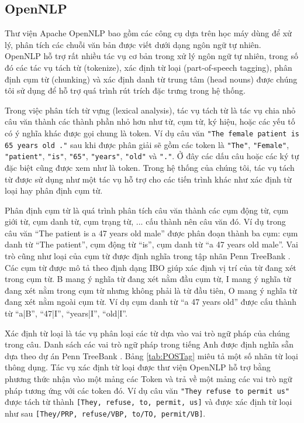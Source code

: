 \subsection*{OpenNLP}
Thư viện Apache OpenNLP bao gồm các công cụ dựa trên học máy dùng để xử lý, phân tích các chuỗi văn bản được viết dưới dạng ngôn ngữ tự nhiên. OpenNLP hỗ trợ rất nhiều tác vụ cơ bản trong xử lý ngôn ngữ tự nhiên, trong số đó các tác vụ tách từ (tokenize), xác định từ loại (part-of-speech tagging), phân định cụm từ (chunking) và xác định danh từ trung tâm (head nouns) được chúng tôi sử dụng để hỗ trợ quá trình rút trích đặc trưng trong hệ thống. 

Trong việc phân tích từ vựng (lexical analysis), tác vụ tách từ là tác vụ chia nhỏ câu văn thành các thành phần nhỏ hơn như từ, cụm từ, ký hiệu, hoặc các yếu tố có ý nghĩa khác được gọi chung là token. Ví dụ câu văn \texttt{"The female patient is 65 years old ."} sau khi được phân giải sẽ gồm các token là \texttt{"The"}, \texttt{"Female"}, \texttt{"patient"}, \texttt{"is"}, \texttt{"65"}, \texttt{"years"}, \texttt{"old"} và \texttt{"."}. Ở đây các dấu câu hoặc các ký tự đặc biệt cũng được xem như là token. Trong hệ thống của chúng tôi, tác vụ tách từ được sử dụng như một tác vụ hỗ trợ cho các tiến trình khác như xác định từ loại hay phân định cụm từ.

Phân định cụm từ là quá trình phân tích câu văn thành các cụm động từ, cụm giới từ, cụm danh từ, cụm trạng từ, ... cấu thành nên câu văn đó. Ví dụ trong câu văn ``The patient is a 47 years old male'' được phân đoạn thành ba cụm: cụm danh từ ``The patient'', cụm động từ ``is'', cụm danh từ ``a 47 years old male''. Vai trò cũng như loại của cụm từ được định nghĩa trong tập nhãn Penn TreeBank \cite{Santorini1990}. Các cụm từ được mô tả theo định dạng IBO giúp xác định vị trí của từ  đang xét trong cụm từ. B mang ý nghĩa từ đang xét nằm đầu cụm từ, I mang ý nghĩa từ đang xét nằm trong cụm từ nhưng không phải là từ đầu tiên, O mang ý nghĩa từ đang xét nằm ngoài cụm từ. Ví dụ cụm danh từ ``a 47 years old'' được cấu thành từ ``a|B'', ``47|I'', ``years|I'', ``old|I''.

Xác định từ loại là tác vụ phân loại các từ dựa vào vai trò ngữ pháp của chúng trong câu. Danh sách các vai trò ngữ pháp trong tiếng Anh được định nghĩa sẵn dựa theo dự án Penn TreeBank \cite{Santorini1990}. Bảng \ref{tab:POSTag} miêu tả một số nhãn từ loại thông dụng. Tác vụ xác định từ loại được thư viện OpenNLP hỗ trợ bằng phương thức nhận vào một mảng các Token và trả về một mảng các vai trò ngữ pháp tương ứng với các token đó. Ví dụ câu văn \texttt{"They refuse to permit us"} được tách từ thành \texttt{[They, refuse, to, permit, us]} và được xác định từ loại như sau \texttt{[They/PRP, refuse/VBP, to/TO, permit/VB]}.

